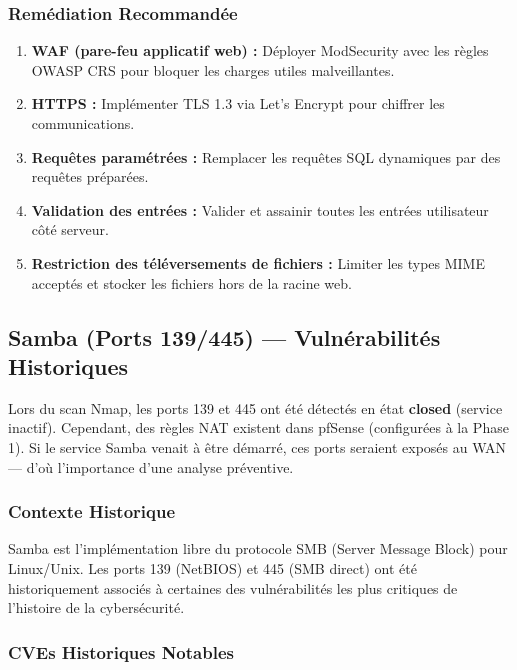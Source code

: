 \documentclass[12pt,a4paper,openany]{report}
\begin{document}
	\subsubsection{Remédiation Recommandée}
	\begin{enumerate}
		\item \textbf{WAF (pare-feu applicatif web) :} Déployer ModSecurity avec les règles OWASP CRS pour bloquer les charges utiles malveillantes.
		\item \textbf{HTTPS :} Implémenter TLS 1.3 via Let's Encrypt pour chiffrer les communications.
		\item \textbf{Requêtes paramétrées :} Remplacer les requêtes SQL dynamiques par des requêtes préparées.
		\item \textbf{Validation des entrées :} Valider et assainir toutes les entrées utilisateur côté serveur.
		\item \textbf{Restriction des téléversements de fichiers :} Limiter les types MIME acceptés et stocker les fichiers hors de la racine web.
	\end{enumerate}
	
	\subsection{Samba (Ports 139/445) --- Vulnérabilités Historiques}
	\label{subsec:samba-cvss}
	
	\begin{tcolorbox}[colback=primary!5!white, colframe=primary, title=\textbf{AVERTISSEMENT : Ports closed mais règles NAT présentes}]
		Lors du scan Nmap, les ports 139 et 445 ont été détectés en état \textbf{closed} (service inactif). Cependant, des règles NAT existent dans pfSense (configurées à la Phase 1). Si le service Samba venait à être démarré, ces ports seraient exposés au WAN --- d'où l'importance d'une analyse préventive.
	\end{tcolorbox}
	
	\subsubsection{Contexte Historique}
	Samba est l'implémentation libre du protocole SMB (Server Message Block) pour Linux/Unix. Les ports 139 (NetBIOS) et 445 (SMB direct) ont été historiquement associés à certaines des vulnérabilités les plus critiques de l'histoire de la cybersécurité.
	
	\subsubsection{CVEs Historiques Notables}
	
\end{document}
